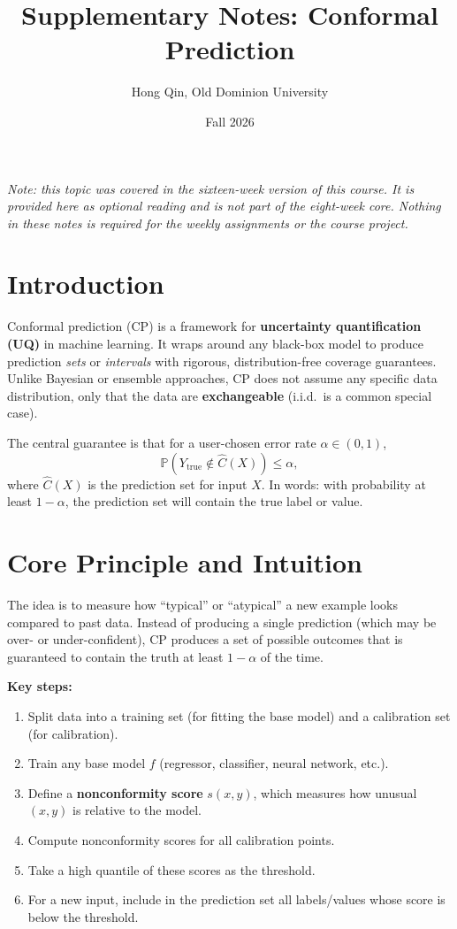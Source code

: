 \documentclass[11pt]{article}
\title{Supplementary Notes: Conformal Prediction}
\author{Hong Qin, Old Dominion University}
\date{Fall 2026}
\theoremstyle{remark}
\begin{document}
\maketitle
\begin{center}\small\itshape Note: this topic was covered in the sixteen-week version of this course. It is provided here as optional reading and is not part of the eight-week core. Nothing in these notes is required for the weekly assignments or the course project.\end{center}
\medskip

\section{Introduction}
Conformal prediction (CP) is a framework for \textbf{uncertainty quantification (UQ)} in machine learning.
It wraps around any black-box model to produce prediction \emph{sets} or \emph{intervals} with rigorous, distribution-free coverage guarantees.
Unlike Bayesian or ensemble approaches, CP does not assume any specific data distribution, only that the data are \textbf{exchangeable} (i.i.d.\ is a common special case).

\bigskip
The central guarantee is that for a user-chosen error rate $\alpha \in (0,1)$,
\[
\mathbb{P}\!\left( Y_{\text{true}} \notin \hat{C}(X) \right) \leq \alpha,
\]
where $\hat{C}(X)$ is the prediction set for input $X$. In words: with probability at least $1-\alpha$, the prediction set will contain the true label or value.

\section{Core Principle and Intuition}
The idea is to measure how ``typical'' or ``atypical'' a new example looks compared to past data.
Instead of producing a single prediction (which may be over- or under-confident), CP produces a set of possible outcomes that is guaranteed to contain the truth at least $1-\alpha$ of the time.

\bigskip
\noindent \textbf{Key steps:}
\begin{enumerate}
    \item Split data into a training set (for fitting the base model) and a calibration set (for calibration).
    \item Train any base model $f$ (regressor, classifier, neural network, etc.).
    \item Define a \textbf{nonconformity score} $s(x,y)$, which measures how unusual $(x,y)$ is relative to the model.
    \item Compute nonconformity scores for all calibration points.
    \item Take a high quantile of these scores as the threshold.
    \item For a new input, include in the prediction set all labels/values whose score is below the threshold.
\end{enumerate}
\end{document}
